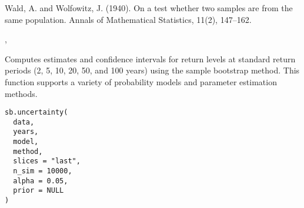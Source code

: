 \documentclass[a4paper]{book}
\begin{document}
%
\begin{References}
Wald, A. and Wolfowitz, J. (1940). On a test whether two samples are from the
same population. Annals of Mathematical Statistics, 11(2), 147–162.
\end{References}
%
\begin{SeeAlso}
, 
\end{SeeAlso}
%
\begin{Examples}
\end{Examples}
%
\begin{Description}
Computes estimates and confidence intervals for return levels at standard return periods
(2, 5, 10, 20, 50, and 100 years) using the sample bootstrap method. This function
supports a variety of probability models and parameter estimation methods.
\end{Description}
%
\begin{Usage}
\begin{verbatim}
sb.uncertainty(
  data,
  years,
  model,
  method,
  slices = "last",
  n_sim = 10000,
  alpha = 0.05,
  prior = NULL
)
\end{verbatim}
\end{Usage}
%
\end{document}
